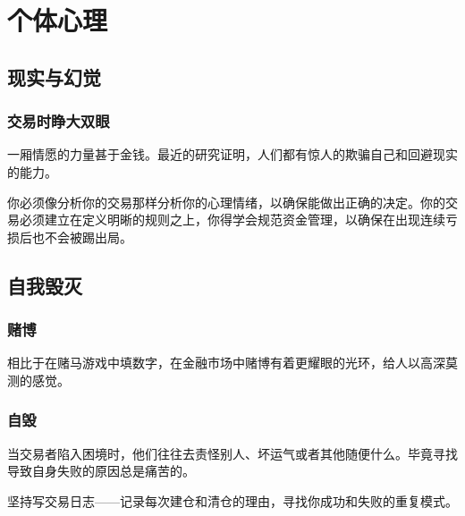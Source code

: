 \chapter{个体心理}
\section{现实与幻觉}
\subsection*{交易时睁大双眼}
一厢情愿的力量甚于金钱。最近的研究证明，人们都有惊人的欺骗自己和回避现实的能力。
\begin{tcolorbox}
    你必须像分析你的交易那样分析你的心理情绪，以确保能做出正确的决定。你的交易必须建立在定义明晰的规则之上，你得学会规范资金管理，以确保在出现连续亏损后也不会被踢出局。
\end{tcolorbox}
\section{自我毁灭}
\subsection*{赌博}
相比于在赌马游戏中填数字，在金融市场中赌博有着更耀眼的光环，给人以高深莫测的感觉。
\subsection*{自毁}
当交易者陷入困境时，他们往往去责怪别人、坏运气或者其他随便什么。毕竟寻找导致自身失败的原因总是痛苦的。
\begin{tcolorbox}
    坚持写交易日志——记录每次建仓和清仓的理由，寻找你成功和失败的重复模式。
\end{tcolorbox}